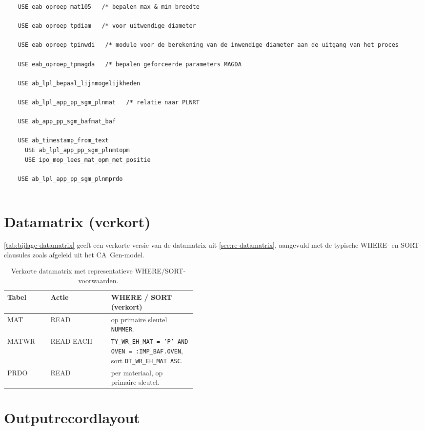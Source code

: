 \begin{verbatim}
    USE eab_oproep_mat105   /* bepalen max & min breedte
    
    USE eab_oproep_tpdiam   /* voor uitwendige diameter
    
    USE eab_oproep_tpinwdi   /* module voor de berekening van de inwendige diameter aan de uitgang van het proces
    
    USE eab_oproep_tpmagda   /* bepalen geforceerde parameters MAGDA
    
    USE ab_lpl_bepaal_lijnmogelijkheden
    
    USE ab_lpl_app_pp_sgm_plnmat   /* relatie naar PLNRT	
    
    USE ab_app_pp_sgm_bafmat_baf
    
    USE ab_timestamp_from_text
      USE ab_lpl_app_pp_sgm_plnmtopm
      USE ipo_mop_lees_mat_opm_met_positie
    
    USE ab_lpl_app_pp_sgm_plnmprdo
    
\end{verbatim}

\section{Datamatrix (verkort)}
\label{sec:bijlage-datamatrix}

\autoref{tab:bijlage-datamatrix} geeft een verkorte versie van de datamatrix uit
\autoref{sec:re-datamatrix}, aangevuld met de typische WHERE- en SORT-clausules zoals afgeleid uit het
CA~Gen-model.

\begin{table}[h]
\centering
\caption[Verkorte datamatrix TPPBAMT]{Verkorte datamatrix met representatieve WHERE/SORT-voorwaarden.}
\label{tab:bijlage-datamatrix}
\small
\begin{tabular}{|l|l|p{0.45\linewidth}|}
\hline
\textbf{Tabel} & \textbf{Actie} & \textbf{WHERE / SORT (verkort)} \\
\hline
MAT  & READ       & op primaire sleutel \texttt{NUMMER}. \\
\hline
MATWR & READ EACH & \texttt{TY\_WR\_EH\_MAT = 'P' AND OVEN = :IMP\_BAF.OVEN}, sort \texttt{DT\_WR\_EH\_MAT ASC}. \\
\hline
PRDO & READ       & per materiaal, op primaire sleutel. \\
\hline
\end{tabular}
\end{table}

\section{Outputrecordlayout}
\label{sec:bijlage-outputlayout}

